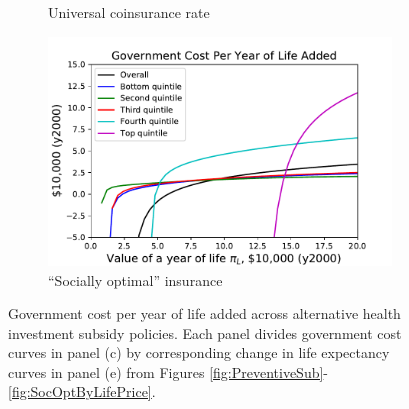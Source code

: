 \documentclass[12pt,pdftex,letterpaper]{article}
\begin{document}
\begin{figure}[h!]
\begin{subfigure}[b]{0.45\textwidth}
        \caption{Universal coinsurance rate}
    \end{subfigure}
    \begin{subfigure}[b]{0.45\textwidth}
        \centering
        \includegraphics[width=\textwidth]{../Figures/SocOptByLifePriceCostPerYear.pdf}
        \caption{``Socially optimal'' insurance}
    \end{subfigure}
    \caption{Government cost per year of life added across alternative health investment subsidy policies.  Each panel divides government cost curves in panel (c) by corresponding change in life expectancy curves in panel (e) from Figures \ref{fig:PreventiveSub}-\ref{fig:SocOptByLifePrice}.}
    \label{fig:CostPerYear}
\end{figure}
\end{document}
